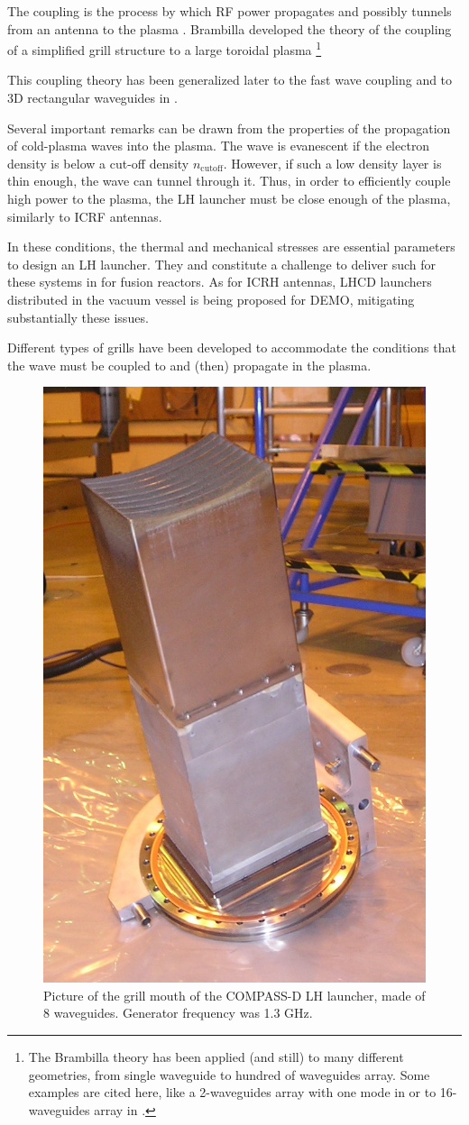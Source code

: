 The coupling is the process by which RF power propagates and possibly tunnels from an antenna to the plasma \parencite{Meneghini2012}. Brambilla developed the theory of the coupling of  a simplified grill structure to a large toroidal plasma \parencite{Brambilla1979} \footnote{The Brambilla theory has been applied (and still) to many different geometries, from single waveguide to hundred of waveguides array. Some examples are cited here, like a 2-waveguides array with one mode in \parencite{Krapchev1978} or to 16-waveguides array in \parencite{Stevens1988}.}

This coupling theory has been generalized later to the fast wave coupling \parencite{Theilhaber1979,Theilhaber1980} and to 3D rectangular waveguides in \parencite{Bers1981, Bers1983}. 

Several important remarks can be drawn from the properties of the propagation of cold-plasma waves into the plasma. The wave is evanescent if the electron density is below a cut-off density $n_{\mathrm{cutoff}}$. However, if such a low density layer is thin enough, the wave can tunnel through it. Thus, in order to efficiently couple high power to the plasma, the LH launcher must be close enough of the plasma, similarly to ICRF antennas. 

In these conditions, the thermal and mechanical stresses are essential parameters to design an LH launcher. They and constitute a challenge to deliver such for these systems in for fusion reactors. As for ICRH antennas, LHCD launchers distributed in the vacuum vessel is being proposed for DEMO, mitigating substantially these issues.

Different types of grills have been developed to accommodate the conditions that the wave must be coupled to and (then) propagate in the plasma. 

\begin{figure}
\centering
\includegraphics[width=0.4\linewidth]{Figures/LHCD/COMPASS_grill_out}
\caption{Picture of the grill mouth of the COMPASS-D LH launcher, made of 8 waveguides. Generator frequency was 1.3 GHz.}
\label{fig:compassgrillout}
\end{figure}

